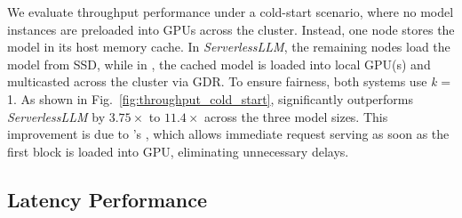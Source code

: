 { 
We evaluate throughput performance under a cold-start scenario, where no model instances are preloaded into GPUs across the cluster. Instead, one node stores the model in its host memory cache. 
In \textit{ServerlessLLM}, the remaining nodes load the model from SSD, while in \SysName, the cached model is loaded into local GPU(s) and multicasted across the cluster via GDR.
To ensure fairness, both systems use \emph{k} = 1. 
As shown in Fig.~\ref{fig:throughput_cold_start},  \SysName significantly outperforms \textit{ServerlessLLM} by $3.75\times$ to $11.4\times$ across the three model sizes. This improvement is due to \SysName's \AlgoName, which allows immediate request serving as soon as the first block is loaded into GPU, eliminating unnecessary delays. 




\subsection{Latency Performance}
\label{subsec:latency}

}
